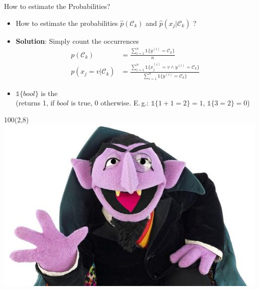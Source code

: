 \begin{frame}{How to estimate the Probabilities?}{}
	\begin{itemize}
		\item How to estimate the probabilities $\widehat{p}(\mathcal{C}_k)$ and $\widehat{p}(x_j \vert \mathcal{C}_k)$ ?
		\item \textbf{Solution}: Simply count the occurrences
		\begin{align}
			\widehat{p}(\mathcal{C}_k)
				&= \frac{\sum_{i=1}^n \mathbb{1}\{ y^{(i)} = \mathcal{C}_k \}}{n} \\[3mm]
			\widehat{p}(x_j = v \vert \mathcal{C}_k)
				&= \frac{\sum_{i=1}^n \mathbb{1}\{ x_j^{(i)} = v \wedge y^{(i)} = \mathcal{C}_k \}}
					{\sum_{i=1}^n \mathbb{1}\{ y^{(i)} = \mathcal{C}_k \}}
		\end{align}
		\item $\mathbb{1}\{ bool \}$ is the  \\[-1mm]
			{\scriptsize (returns 1, if $bool$ is true, 0 otherwise.
			E.\,g.: $\mathbb{1}\{1+1=2\} = 1$, $\mathbb{1}\{3=2\} = 0$)}
	\end{itemize}
	\begin{textblock}{100}(2,8)
		\includegraphics[scale=0.5]{03_decision_theory/02_img/count_count}
	\end{textblock}
\end{frame}


